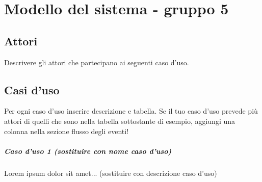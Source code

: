
\chapter{Modello del sistema - gruppo 5}
\label{ref:modSistemaGruppo5}


\section{Attori}
Descrivere gli attori che partecipano ai seguenti caso d'uso.

\section{Casi d'uso}
Per ogni caso d'uso inserire descrizione e tabella. Se il tuo caso d'uso prevede più attori di quelli che sono nella tabella sottostante di esempio, aggiungi una colonna nella sezione flusso degli eventi!

\paragraph{Caso d'uso 1 (sostituire con nome caso d'uso) \\} 
Lorem ipsum dolor sit amet... (sostituire con descrizione caso d'uso)

